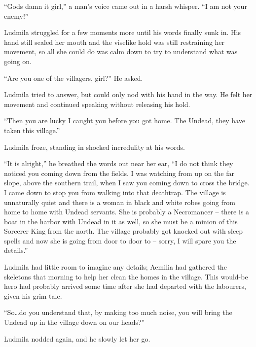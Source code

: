  

“Gods damn it girl,” a man’s voice came out in a harsh whisper. “I am not your enemy!”

 

Ludmila struggled for a few moments more until his words finally sunk in. His hand still sealed her mouth and the viselike hold was still restraining her movement, so all she could do was calm down to try to understand what was going on.

 

“Are you one of the villagers, girl?” He asked.

 

Ludmila tried to answer, but could only nod with his hand in the way. He felt her movement and continued speaking without releasing his hold.

 

“Then you are lucky I caught you before you got home. The Undead, they have taken this village.”

 

Ludmila froze, standing in shocked incredulity at his words.

 

“It is alright,” he breathed the words out near her ear, “I do not think they noticed you coming down from the fields. I was watching from up on the far slope, above the southern trail, when I saw you coming down to cross the bridge. I came down to stop you from walking into that deathtrap. The village is unnaturally quiet and there is a woman in black and white robes going from home to home with Undead servants. She is probably a Necromancer – there is a boat in the harbor with Undead in it as well, so she must be a minion of this Sorcerer King from the north. The village probably got knocked out with sleep spells and now she is going from door to door to – sorry, I will spare you the details.”

 

Ludmila had little room to imagine any details; Aemilia had gathered the skeletons that morning to help her clean the homes in the village. This would-be hero had probably arrived some time after she had departed with the labourers, given his grim tale.

 

“So…do you understand that, by making too much noise, you will bring the Undead up in the village down on our heads?”

 

Ludmila nodded again, and he slowly let her go.

